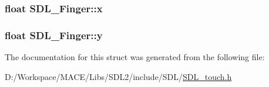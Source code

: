 \subsubsection[{\texorpdfstring{x}{x}}]{\setlength{\rightskip}{0pt plus 5cm}float S\+D\+L\+\_\+\+Finger\+::x}\hypertarget{struct_s_d_l___finger_ab91dfbd03c3215560457fef44e1c7755}{}\label{struct_s_d_l___finger_ab91dfbd03c3215560457fef44e1c7755}
\subsubsection[{\texorpdfstring{y}{y}}]{\setlength{\rightskip}{0pt plus 5cm}float S\+D\+L\+\_\+\+Finger\+::y}\hypertarget{struct_s_d_l___finger_a0a2c7a06ae641940111e03801c672cf9}{}\label{struct_s_d_l___finger_a0a2c7a06ae641940111e03801c672cf9}


The documentation for this struct was generated from the following file\+:\begin{DoxyCompactItemize}
\item 
D\+:/\+Workspace/\+M\+A\+C\+E/\+Libs/\+S\+D\+L2/include/\+S\+D\+L/\hyperlink{_s_d_l__touch_8h}{S\+D\+L\+\_\+touch.\+h}\end{DoxyCompactItemize}
